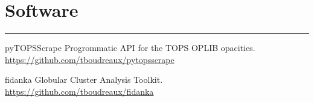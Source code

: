 \section{Software}
\noindent\rule{4cm}{0.4pt}
\begin{softwarelist}
    \item[pyTOPSScrape] Progrommatic API for the TOPS OPLIB opacities. \url{https://github.com/tboudreaux/pytopsscrape}
    \item[fidanka] Globular Cluster Analysis Toolkit. \url{https://github.com/tboudreaux/fidanka}
\end{softwarelist}
